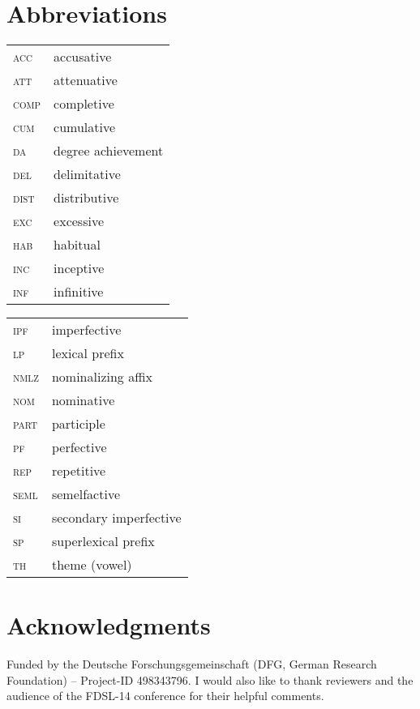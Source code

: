 \documentclass[output=paper]{langscibook}
\begin{document}
\section*{Abbreviations}

\begin{tabularx}{.5\textwidth}{@{}lQ}
\textsc{acc}&accusative\\
\textsc{att}&attenuative\\
\textsc{comp}&completive\\
\textsc{cum}&cumulative\\
\textsc{da}&degree achievement\\
\textsc{del}&delimitative\\
\textsc{dist}&distributive\\
\textsc{exc}&excessive\\
\textsc{hab}&habitual\\
\textsc{inc}&inceptive\\
\textsc{inf}&infinitive\\
\end{tabularx}%
\begin{tabularx}{.5\textwidth}{lQ@{}}
\textsc{ipf}&imperfective\\
\textsc{lp}&lexical prefix\\
\textsc{nmlz}&nominalizing affix\\
\textsc{nom}&nominative\\
\textsc{part}&participle\\
\textsc{pf}&perfective\\
\textsc{rep}&repetitive\\
\textsc{seml}&semelfactive\\
\textsc{si}&secondary imperfective\\
\textsc{sp}&superlexical prefix\\
\textsc{th}&theme (vowel)\\
\end{tabularx}

\section*{Acknowledgments}
Funded by the Deutsche Forschungsgemeinschaft (DFG, German Research Foundation) – Project-ID 498343796. I would also like to thank reviewers and the audience of the FDSL-14 conference for their helpful comments.\largerpage[2]


\printbibliography[heading=subbibliography,notkeyword=this]
\end{document}
